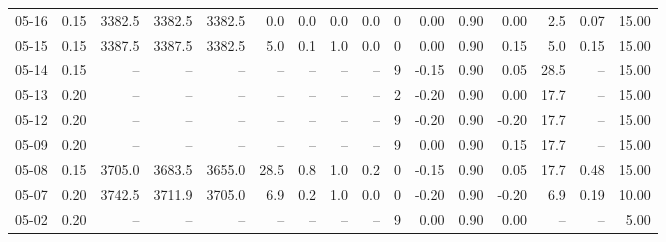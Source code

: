 \begin{threeparttable}
{\begin{tabular}{lrrrrrrrrrrrrrrr}
  05-16 &     0.15 & 3382.5 & 3382.5 & 3382.5 &        0.0 &            0.0 &                      0.0 &                 0.0 &              0 &       0.00 &      0.90 &           0.00 &              2.5 &            0.07 &                  15.00 \\
  05-15 &     0.15 & 3387.5 & 3387.5 & 3382.5 &        5.0 &            0.1 &                      1.0 &                 0.0 &              0 &       0.00 &      0.90 &           0.15 &              5.0 &            0.15 &                  15.00 \\
  05-14 &     0.15 &     -- &     -- &     -- &         -- &             -- &                       -- &                  -- &              9 &      -0.15 &      0.90 &           0.05 &             28.5 &              -- &                  15.00 \\
  05-13 &     0.20 &     -- &     -- &     -- &         -- &             -- &                       -- &                  -- &              2 &      -0.20 &      0.90 &           0.00 &             17.7 &              -- &                  15.00 \\
  05-12 &     0.20 &     -- &     -- &     -- &         -- &             -- &                       -- &                  -- &              9 &      -0.20 &      0.90 &          -0.20 &             17.7 &              -- &                  15.00 \\
  05-09 &     0.20 &     -- &     -- &     -- &         -- &             -- &                       -- &                  -- &              9 &       0.00 &      0.90 &           0.15 &             17.7 &              -- &                  15.00 \\
  05-08 &     0.15 & 3705.0 & 3683.5 & 3655.0 &       28.5 &            0.8 &                      1.0 &                 0.2 &              0 &      -0.15 &      0.90 &           0.05 &             17.7 &            0.48 &                  15.00 \\
  05-07 &     0.20 & 3742.5 & 3711.9 & 3705.0 &        6.9 &            0.2 &                      1.0 &                 0.0 &              0 &      -0.20 &      0.90 &          -0.20 &              6.9 &            0.19 &                  10.00 \\
  05-02 &     0.20 &     -- &     -- &     -- &         -- &             -- &                       -- &                  -- &              9 &       0.00 &      0.90 &           0.00 &               -- &              -- &                   5.00 \\

\end{tabular}}
\end{threeparttable}
